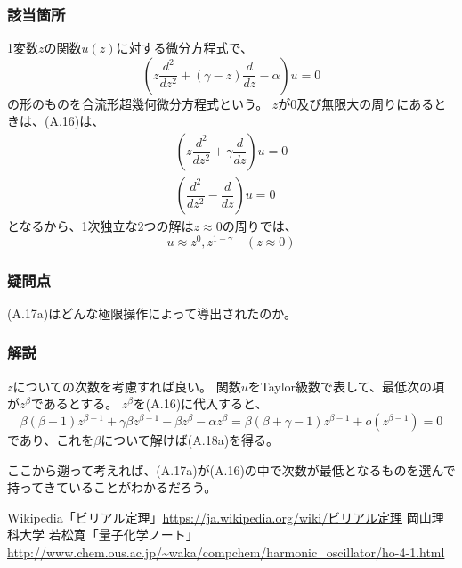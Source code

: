 \documentclass{jsarticle}
\begin{document}
\subsubsection*{該当箇所}
1変数$z$の関数$u(z)$に対する微分方程式で、
\begin{equation}
    \tag{A.16}
    \left(
        z\dfrac{d^2}{dz^2}
        +
        (\gamma-z)\dfrac{d}{dz}
        -
        \alpha
    \right)
    u=0
\end{equation}
の形のものを合流形超幾何微分方程式という。
$z$が$0$及び無限大の周りにあるときは、(A.16)は、
\begin{eqnarray}
    \tag{A.17a}
    \left(
        z\dfrac{d^2}{dz^2}
        +
        \gamma\dfrac{d}{dz}
    \right)
    u=0
    \\
    \tag{A.17b}
    \left(
        \dfrac{d^2}{dz^2}
        -
        \dfrac{d}{dz}
    \right)
    u=0
\end{eqnarray}
となるから、1次独立な2つの解は$z\approx0$の周りでは、
\begin{equation}
    \tag{A.18a}
    u\approx z^0, z^{1-\gamma}\quad(z\approx0)
\end{equation}

\subsubsection*{疑問点}
(A.17a)はどんな極限操作によって導出されたのか。

\subsubsection*{解説}

$z$についての次数を考慮すれば良い。
関数$u$をTaylor級数で表して、最低次の項が$z^\beta$であるとする。
$z^\beta$を(A.16)に代入すると、
\begin{equation*}
    \beta(\beta-1)z^{\beta-1}
    +
    \gamma\beta z^{\beta-1}
    -
    \beta z^\beta
    -\alpha z^\beta
    =
    \beta(\beta+\gamma-1)z^{\beta-1}
    +
    o(z^{\beta-1})
    =
    0
\end{equation*}
であり、これを$\beta$について解けば(A.18a)を得る。

ここから遡って考えれば、(A.17a)が(A.16)の中で次数が最低となるものを選んで持ってきていることがわかるだろう。


\begin{thebibliography}
     Wikipedia「ビリアル定理」\url{https://ja.wikipedia.org/wiki/ビリアル定理}
     岡山理科大学 若松寛「量子化学ノート」\url{http://www.chem.ous.ac.jp/~waka/compchem/harmonic_oscillator/ho-4-1.html}
\end{thebibliography}
\end{document}

